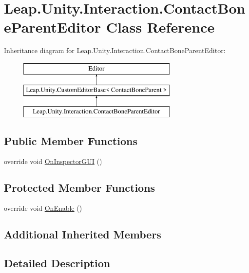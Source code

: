 \hypertarget{class_leap_1_1_unity_1_1_interaction_1_1_contact_bone_parent_editor}{}\section{Leap.\+Unity.\+Interaction.\+Contact\+Bone\+Parent\+Editor Class Reference}
\label{class_leap_1_1_unity_1_1_interaction_1_1_contact_bone_parent_editor}
Inheritance diagram for Leap.\+Unity.\+Interaction.\+Contact\+Bone\+Parent\+Editor\+:\begin{figure}[H]
\begin{center}
\leavevmode
\includegraphics[height=3.000000cm]{class_leap_1_1_unity_1_1_interaction_1_1_contact_bone_parent_editor}
\end{center}
\end{figure}
\subsection*{Public Member Functions}
\begin{DoxyCompactItemize}
\item 
override void \mbox{\hyperlink{class_leap_1_1_unity_1_1_interaction_1_1_contact_bone_parent_editor_ab77bcfdec8c5517bb0266a310a26a1af}{On\+Inspector\+G\+UI}} ()
\end{DoxyCompactItemize}
\subsection*{Protected Member Functions}
\begin{DoxyCompactItemize}
\item 
override void \mbox{\hyperlink{class_leap_1_1_unity_1_1_interaction_1_1_contact_bone_parent_editor_abc5a408dfb6b991eae126a5b283f608d}{On\+Enable}} ()
\end{DoxyCompactItemize}
\subsection*{Additional Inherited Members}


\subsection{Detailed Description}


